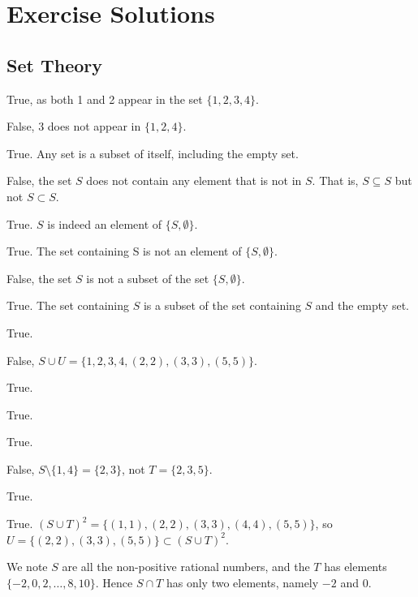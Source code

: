 \appendix
\chapter{Exercise Solutions}

\section{Set Theory}
\begin{questions}
    \item \begin{partquestions}{\alph*}
        \item True, as both 1 and 2 appear in the set $\{1, 2, 3, 4\}$.
        \item False, 3 does not appear in $\{1, 2, 4\}$.
        \item True. Any set is a subset of itself, including the empty set.
        \item False, the set $S$ does not contain any element that is not in $S$. That is, $S \subseteq S$ but not $S \subset S$.
        \item True. $S$ is indeed an element of $\{S, \emptyset\}$.
        \item True. The set containing S is not an element of $\{S, \emptyset\}$.
        \item False, the set $S$ is not a subset of the set $\{S, \emptyset\}$.
        \item True. The set containing $S$ is a subset of the set containing $S$ and the empty set.
    \end{partquestions}
    
    \item \begin{partquestions}{\alph*}
        \item True.
        \item False, $S \cup U = \{1, 2, 3, 4, (2, 2), (3, 3), (5, 5)\}$.
        \item True.
        \item True.
        \item True.
        \item False, $S \setminus \{1, 4\} = \{2, 3\}$, not $T = \{2, 3, 5\}$.
        \item True.
        \item True. $(S \cup T)^2 = \{(1,1), (2,2), (3,3), (4,4), (5,5)\}$, so $U = \{(2,2), (3,3), (5,5)\} \subset (S \cup T)^2$.
    \end{partquestions}

    \item We note $S$ are all the non-positive rational numbers, and the $T$ has elements $\{-2, 0, 2, \dots, 8, 10\}$. Hence $S \cap T$ has only two elements, namely $-2$ and $0$.
\end{questions}

